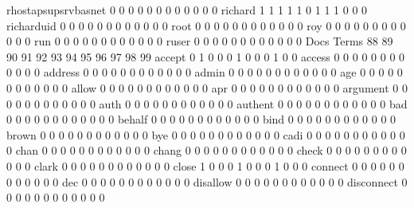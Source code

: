\documentclass[compress,8pt]{beamer}
\begin{document}
\begin{frame}
\begin{Schunk}
  rhostapsupsrvbasnet                       0  0  0  0  0  0  0  0  0  0  0  0
  richard                                   1  1  1  1  1  0  1  1  1  0  0  0
  richarduid                                0  0  0  0  0  0  0  0  0  0  0  0
  root                                      0  0  0  0  0  0  0  0  0  0  0  0
  roy                                       0  0  0  0  0  0  0  0  0  0  0  0
  run                                       0  0  0  0  0  0  0  0  0  0  0  0
  ruser                                     0  0  0  0  0  0  0  0  0  0  0  0
                                          Docs
Terms                                      88 89 90 91 92 93 94 95 96 97 98 99
  accept                                    0  1  0  0  0  1  0  0  0  1  0  0
  access                                    0  0  0  0  0  0  0  0  0  0  0  0
  address                                   0  0  0  0  0  0  0  0  0  0  0  0
  admin                                     0  0  0  0  0  0  0  0  0  0  0  0
  age                                       0  0  0  0  0  0  0  0  0  0  0  0
  allow                                     0  0  0  0  0  0  0  0  0  0  0  0
  apr                                       0  0  0  0  0  0  0  0  0  0  0  0
  argument                                  0  0  0  0  0  0  0  0  0  0  0  0
  auth                                      0  0  0  0  0  0  0  0  0  0  0  0
  authent                                   0  0  0  0  0  0  0  0  0  0  0  0
  bad                                       0  0  0  0  0  0  0  0  0  0  0  0
  behalf                                    0  0  0  0  0  0  0  0  0  0  0  0
  bind                                      0  0  0  0  0  0  0  0  0  0  0  0
  brown                                     0  0  0  0  0  0  0  0  0  0  0  0
  bye                                       0  0  0  0  0  0  0  0  0  0  0  0
  cadi                                      0  0  0  0  0  0  0  0  0  0  0  0
  chan                                      0  0  0  0  0  0  0  0  0  0  0  0
  chang                                     0  0  0  0  0  0  0  0  0  0  0  0
  check                                     0  0  0  0  0  0  0  0  0  0  0  0
  clark                                     0  0  0  0  0  0  0  0  0  0  0  0
  close                                     1  0  0  0  1  0  0  0  1  0  0  0
  connect                                   0  0  0  0  0  0  0  0  0  0  0  0
  dec                                       0  0  0  0  0  0  0  0  0  0  0  0
  disallow                                  0  0  0  0  0  0  0  0  0  0  0  0
  disconnect                                0  0  0  0  0  0  0  0  0  0  0  0

\end{Schunk}
\end{frame}
\end{document}
